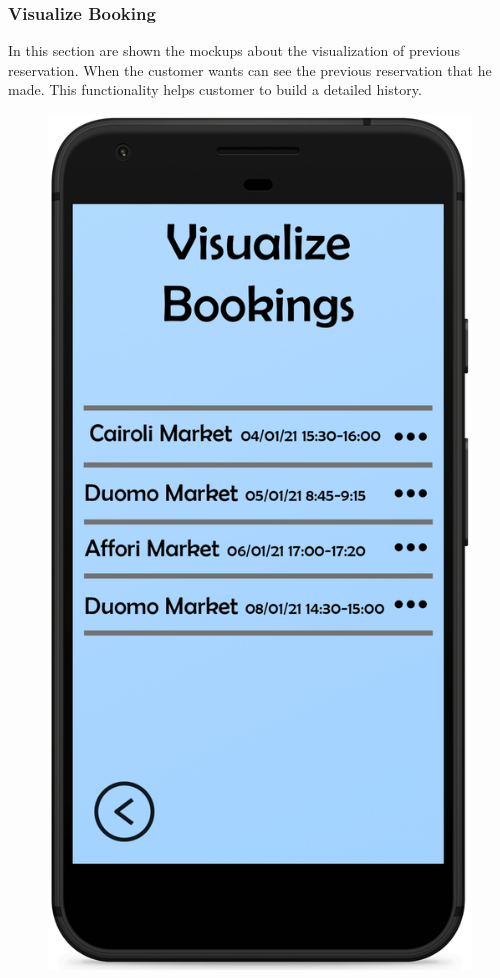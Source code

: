 \documentclass{article}
\begin{document}
		\newpage
		
		\subsubsection{Visualize Booking}
		In this section are shown the mockups about the visualization of previous reservation. When the customer wants can see the previous reservation that he made. This functionality helps customer to build a detailed history.\\		\bigskip
		\bigskip
		\begin{figure}[!h]
			\centering
			\begin{minipage}[!h]{0.4\textwidth}
				\includegraphics[width=\textwidth]{../Mockups/VisualizeBookings.png}

\end{minipage}
\end{figure}
\end{document}
